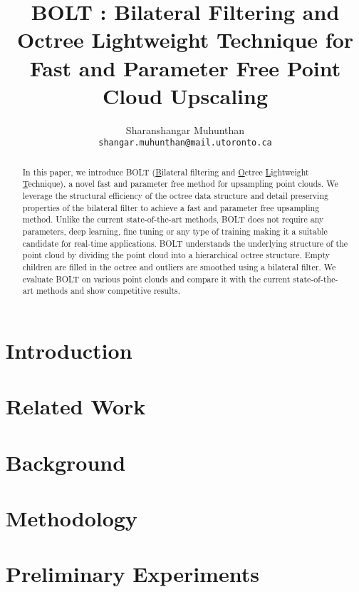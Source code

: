 \documentclass[fleqn, twocolumn]{article}
\author{Sharanshangar Muhunthan \\ \texttt{shangar.muhunthan@mail.utoronto.ca}}
\title{BOLT \emoji{high-voltage}: Bilateral Filtering and Octree Lightweight Technique for Fast and Parameter Free Point Cloud Upscaling}
\begin{document}
\maketitle
\begin{abstract}
	In this paper, we introduce BOLT (\underline{B}ilateral filtering and \underline{O}ctree \underline{L}ightweight \underline{T}echnique), a novel fast and parameter free method for upsampling point clouds.
	We leverage the structural efficiency of the octree data structure and detail preserving properties of the bilateral filter to achieve a fast and parameter free upsampling method.
	Unlike the current state-of-the-art methods, BOLT does not require any parameters, deep learning, fine tuning or any type of training making it a suitable candidate for real-time applications.
	BOLT understands the underlying structure of the point cloud by dividing the point cloud into a hierarchical octree structure. 
	Empty children are filled in the octree and outliers are smoothed using a bilateral filter.
	We evaluate BOLT on various point clouds and compare it with the current state-of-the-art methods and show competitive results.
\end{abstract}

\section{Introduction}



\section{Related Work}



\section{Background}



\section{Methodology}



\section{Preliminary Experiments}



%
%
\pagebreak


\end{document}
